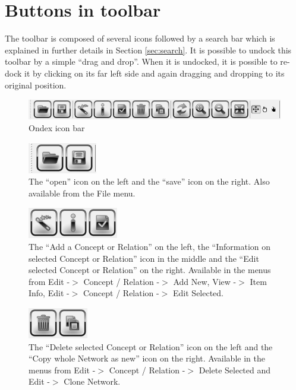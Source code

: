 \section{Buttons in toolbar}
\label{sec:ref_icons}

The toolbar is composed of several icons followed by a search bar which is explained in further details in Section \ref{sec:search}.
It is possible to undock this toolbar by a simple ``drag and drop''. 
When it is undocked, it is possible to re-dock it by clicking on its far left side and again dragging and dropping to its original position.

\begin{figure}[H]
\centering
\includegraphics[scale=0.7]{images/Oct12/icon_bar.png} 
\caption{Ondex icon bar}
\label{fig:icon_bar}
\end{figure}

\begin{figure}[H]
\centering
\includegraphics[scale=0.9]{images/Oct12/icon_open_save.png} 
\caption{The ``open'' icon on the left and the ``save'' icon on the right. Also available from the File menu.}
\label{fig:icon_open_save}
\end{figure}

\begin{figure}[H]
\centering
\includegraphics[scale=0.9]{images/Oct12/icon_add_i_v.png} 
\caption{The ``Add a Concept or Relation'' on the left, the ``Information on selected Concept or Relation'' icon in the middle 
and the ``Edit selected Concept or Relation'' on the right.
Available in the menus from Edit -$>$ Concept / Relation -$>$ Add New, View -$>$ Item Info, Edit -$>$ Concept / Relation -$>$ Edit Selected.}
\label{fig:icon_add_i_v}
\end{figure}

\begin{figure}[H]
\centering
\includegraphics[scale=0.9]{images/Oct12/icon_del_clone.png} 
\caption{The ``Delete selected Concept or Relation'' icon on the left and the ``Copy whole Network as new'' icon on the right.
Available in the menus from Edit -$>$ Concept / Relation -$>$ Delete Selected and Edit -$>$ Clone Network.}
\label{fig:icon_del_clone}
\end{figure}

